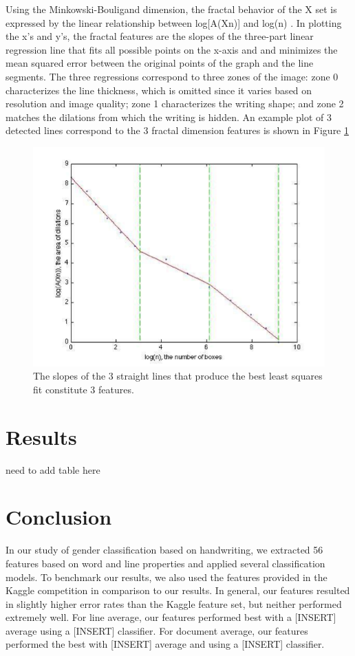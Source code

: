 \documentclass[paper=a4, fontsize=11pt]{scrartcl} %
\numberwithin{equation}{section} %
\numberwithin{figure}{section} %
\numberwithin{table}{section} %
\begin{document}
Using the Minkowski-Bouligand dimension, the fractal behavior of the X
set is expressed by the linear relationship between log[A(Xn)] and
log(n) \cite{SyntheticParameters}. In plotting the x's and y's, the
fractal features are the slopes of the three-part linear regression
line that fits all possible points on the x-axis and and minimizes the
mean squared error between the original points of the graph and the
line segments\cite{GeometricalFeatures}.  The three regressions
correspond to three zones of the image: zone 0 characterizes the line
thickness, which is omitted since it varies based on resolution and
image quality; zone 1 characterizes the writing shape; and zone 2
matches the dilations from which the writing is hidden. An example
plot of 3 detected lines correspond to the 3 fractal dimension
features is shown in Figure \ref{fig:fractaldimension}

\begin{figure}
  \centering \includegraphics{fractaldimension.png}
  \caption{The slopes of the 3 straight lines that produce the best
    least squares fit constitute 3 features.}
  \label{fig:fractaldimension}
\end{figure}

\section{Results}
need to add table here
\label{sec:results}
\section{Conclusion}
In our study of gender classification based on handwriting, we
extracted 56 features based on word and line properties and applied
several classification models. To benchmark our results, we also used
the features provided in the Kaggle competition in comparison to our
results. In general, our features resulted in slightly higher error
rates than the Kaggle feature set, but neither performed extremely
well. For line average, our features performed best with a [INSERT]
average using a [INSERT] classifier. For document average, our
features performed the best with [INSERT] average and using a [INSERT]
classifier.
\end{document}
